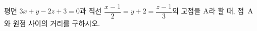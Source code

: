 평면 $3x+y-2z+3=0$과 직선 $\dfrac{x-1}{2}=y+2=\dfrac{z-1}{3}$의 교점을 $\mathrm{A}$라 할 때, 점~$\mathrm{A}$와 원점 사이의 거리를 구하시오.
